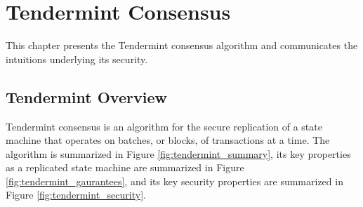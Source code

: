 \chapter{Tendermint Consensus}
\label{ch:tendermint}

This chapter presents the Tendermint consensus algorithm and communicates the intuitions underlying its security.

\section{Tendermint Overview}

Tendermint consensus is an algorithm for the secure replication of a state machine that operates on batches, or blocks, of transactions at a time.
The algorithm is summarized in Figure \ref{fig:tendermint_summary},
its key properties as a replicated state machine are summarized in Figure \ref{fig:tendermint_gaurantees}, and its key security properties are summarized in Figure \ref{fig:tendermint_security}.

